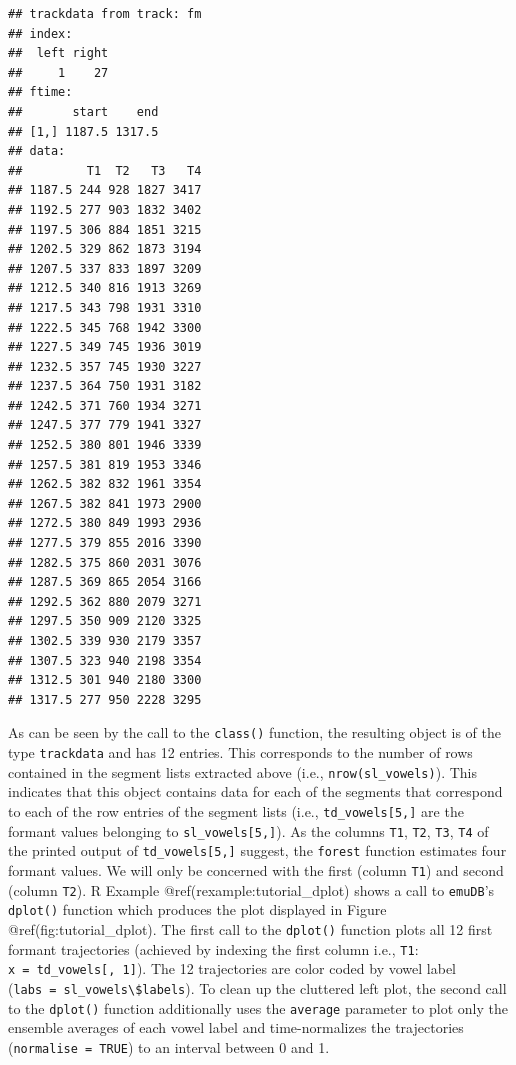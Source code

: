 \documentclass[]{book}
\theoremstyle{definition}
\theoremstyle{definition}
\theoremstyle{definition}
\theoremstyle{remark}
\begin{document}
\begin{verbatim}
## trackdata from track: fm 
## index:
##  left right
##     1    27
## ftime:
##       start    end
## [1,] 1187.5 1317.5
## data:
##         T1  T2   T3   T4
## 1187.5 244 928 1827 3417
## 1192.5 277 903 1832 3402
## 1197.5 306 884 1851 3215
## 1202.5 329 862 1873 3194
## 1207.5 337 833 1897 3209
## 1212.5 340 816 1913 3269
## 1217.5 343 798 1931 3310
## 1222.5 345 768 1942 3300
## 1227.5 349 745 1936 3019
## 1232.5 357 745 1930 3227
## 1237.5 364 750 1931 3182
## 1242.5 371 760 1934 3271
## 1247.5 377 779 1941 3327
## 1252.5 380 801 1946 3339
## 1257.5 381 819 1953 3346
## 1262.5 382 832 1961 3354
## 1267.5 382 841 1973 2900
## 1272.5 380 849 1993 2936
## 1277.5 379 855 2016 3390
## 1282.5 375 860 2031 3076
## 1287.5 369 865 2054 3166
## 1292.5 362 880 2079 3271
## 1297.5 350 909 2120 3325
## 1302.5 339 930 2179 3357
## 1307.5 323 940 2198 3354
## 1312.5 301 940 2180 3300
## 1317.5 277 950 2228 3295
\end{verbatim}

As can be seen by the call to the \texttt{class()} function, the
resulting object is of the type \texttt{trackdata} and has 12 entries.
This corresponds to the number of rows contained in the segment lists
extracted above (i.e., \texttt{nrow(sl\_vowels)}). This indicates that
this object contains data for each of the segments that correspond to
each of the row entries of the segment lists (i.e.,
\texttt{td\_vowels{[}5,{]}} are the formant values belonging to
\texttt{sl\_vowels{[}5,{]}}). As the columns \texttt{T1}, \texttt{T2},
\texttt{T3}, \texttt{T4} of the printed output of
\texttt{td\_vowels{[}5,{]}} suggest, the \texttt{forest} function
estimates four formant values. We will only be concerned with the first
(column \texttt{T1}) and second (column \texttt{T2}). R Example
@ref(rexample:tutorial\_dplot) shows a call to \texttt{emuDB}'s
\texttt{dplot()} function which produces the plot displayed in Figure
@ref(fig:tutorial\_dplot). The first call to the \texttt{dplot()}
function plots all 12 first formant trajectories (achieved by indexing
the first column i.e., \texttt{T1}:
\texttt{x\ =\ td\_vowels{[},\ 1{]}}). The 12 trajectories are color
coded by vowel label
(\texttt{labs\ =\ sl\_vowels\textbackslash{}\$labels}). To clean up the
cluttered left plot, the second call to the \texttt{dplot()} function
additionally uses the \texttt{average} parameter to plot only the
ensemble averages of each vowel label and time-normalizes the
trajectories (\texttt{normalise\ =\ TRUE}) to an interval between 0 and
1.
\end{document}
